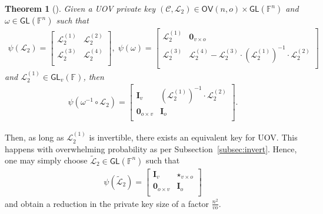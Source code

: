 \documentclass[english]{ufsc-thesis-rn46-2019/ufsc-thesis-rn46-2019}
\newtheorem{theorem}{Theorem}[section]
\theoremstyle{definition}
\begin{document}
\begin{theorem}[{\cite[Thm.~2]{Beullens:201706}}]
  Given a UOV private key
  $(\mathcal{C}, \mathcal{L}_{2}) \in \mathsf{OV}(n, o)
    \times \mathsf{GL}(\mathbb{F}^{n})$
  and $\omega \in \mathsf{GL}(\mathbb{F}^{n})$ such that
  \begin{align}
    \psi(\mathcal{L}_{2}) =
    \begin{bmatrix}
      \mathcal{L}_{2}^{(1)} & \mathcal{L}_{2}^{(2)} \\
      \mathcal{L}_{2}^{(3)} & \mathcal{L}_{2}^{(4)} \\
    \end{bmatrix},\;
    \psi(\omega) =
    \begin{bmatrix}
      \mathcal{L}_{2}^{(1)}
        & \mathbf{0}_{v \times o} \\
      \mathcal{L}_{2}^{(3)}
        & \mathcal{L}_{2}^{(4)} -\mathcal{L}_{2}^{(3)}
          \cdot {(\mathcal{L}_{2}^{(1)})}^{-1}
          \cdot \mathcal{L}_{2}^{(2)} \\
    \end{bmatrix}
  \end{align}
  and $\mathcal{L}_{2}^{(1)} \in \mathsf{GL}_{v}(\mathbb{F})$, then
  \begin{align}
    \psi(\omega^{-1} \circ \mathcal{L}_{2}) =
    \begin{bmatrix}
      \mathbf{I}_{v}
        & {(\mathcal{L}_{2}^{(1)})}^{-1} \cdot \mathcal{L}_{2}^{(2)} \\
      \mathbf{0}_{o \times v}
        & \mathbf{I}_{o} \\
    \end{bmatrix}.
  \end{align}
\end{theorem}

Then, as long as $\mathcal{L}_{2}^{(1)}$ is invertible, there exists an
equivalent key for UOV\@. This happens with overwhelming probability as per
Subsection~\ref{subsec:invert}. Hence, one may simply choose
$\widetilde{\mathcal{L}}_{2} \in \mathsf{GL}(\mathbb{F}^{n})$ such that
\begin{align}
  \psi(\widetilde{\mathcal{L}}_{2}) =
  \begin{bmatrix}
    \mathbf{I}_{v}          & \star_{v \times o} \\
    \mathbf{0}_{o \times v} & \mathbf{I}_{o}     \\
  \end{bmatrix}
\end{align}
and obtain a reduction in the private key size of a factor $\frac{n^{2}}{v o}$.
\end{document}
